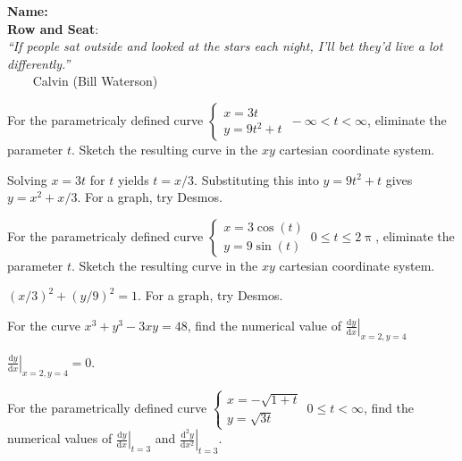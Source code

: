 \documentclass[12pt,fleqn]{exam}
\newcommand{\class}{MATH 202, Fall \the\year}
\begin{document}
\large
\noindent\makebox[3.0truein][l]{\textbf{\class}}
\textbf{Name:} \hrulefill \\
\noindent {}
\textbf{Row and Seat}:\hrulefill\\





\noindent \emph{“If people sat outside and looked at 
the stars each night, I’ll bet they’d live a lot differently.”}\\
  $\phantom{xxx}$ \hfill {\sc Calvin (Bill Waterson)}


\begin{questions} 
    
  
\question For the parametricaly defined curve $\begin{cases}
      x = 3 t \\ y = 9 t^2 + t \end{cases} \, -\infty < t < \infty$,
      eliminate the parameter $t$. Sketch the resulting curve in
      the $xy$ cartesian coordinate system.

\begin{solution}[2.5in] Solving $  x = 3 t$ for $t$ yields $t = x/3$.
  Substituting this into  $y = 9 t^2 + t$ gives $y = x^2 + x / 3$.
  For a graph, try Desmos.
\end{solution}

\question For the parametricaly defined curve $\begin{cases}
    x = 3 \cos(t) \\ y = 9 \sin(t) \end{cases} \, 0 \leq  t \leq 2 \uppi$,
    eliminate the parameter $t$. Sketch the resulting curve in
    the $xy$ cartesian coordinate system.

\begin{solution}%
  $(x/3)^2 + (y/9)^2 = 1$.  For a graph, try Desmos.
\end{solution}

\newpage


\question For the curve $x^3 + y^3 - 3 x y = 48$, find the 
numerical value of $\displaystyle 
\left . \frac{\mathrm{d} y}{\mathrm{d}x} \right |_{x=2,y=4}$
\begin{solution}[3.5in]
  $\left . \frac{\mathrm{d} y}{\mathrm{d}x} \right |_{x=2,y=4} = 0$.
\end{solution}

\question For the parametrically defined curve 
$\displaystyle \begin{cases} x = -\sqrt{1+t} \\ y = \sqrt{3t} 
\end{cases} \, 0 \leq t < \infty$, find the numerical values 
of $\left . \frac{\mathrm{d} y}{\mathrm{d}x} \right |_{t=3}$
and $\left . \frac{\mathrm{d}^2 y}{\mathrm{d} x^2} \right |_{t=3}$.


\end{questions}
\end{document}
